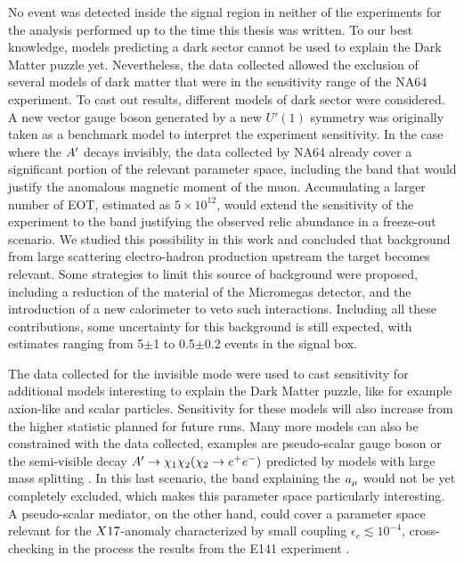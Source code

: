 No event was detected inside the signal region in neither of the experiments for the analysis performed up to the time this thesis was written. To our best knowledge, models predicting a dark sector cannot be used to explain the Dark Matter puzzle yet. Nevertheless, the data collected allowed the exclusion of several models of dark matter that were in the sensitivity range of the NA64 experiment. To cast out results, different models of dark sector were considered. A new vector gauge boson generated by a new $U'(1)$ symmetry was originally taken as a benchmark model to interpret the experiment sensitivity. In the case where the $A'$ decays invisibly, the data collected by NA64 already cover a significant portion of the relevant parameter space, including the band that would justify the anomalous magnetic moment of the muon. Accumulating a larger number of EOT, estimated as $5 \times 10^{12}$, would extend the sensitivity of the experiment to the band justifying the observed relic abundance in a freeze-out scenario. We studied this possibility in this work and concluded that background from large scattering electro-hadron production upstream the target becomes relevant. Some strategies to limit this source of background were proposed, including a reduction of the material of the Micromegas detector, and the introduction of a new calorimeter to veto such interactions. Including all these contributions, some uncertainty for this background is still expected, with estimates ranging from 5$\pm$1 to 0.5$\pm$0.2 events in the signal box.

The data collected for the invisible mode were used to cast sensitivity for additional models interesting to explain the Dark Matter puzzle, like for example axion-like and scalar particles. Sensitivity for these models will also increase from the higher statistic planned for future runs. Many more models can also be constrained with the data collected, examples are pseudo-scalar gauge boson or the semi-visible decay $A' \to \chi_1 \chi_2 (\chi_2 \to e^+e^-)$ predicted by models with large mass splitting \cite{Mohlabeng_2019}. In this last scenario, the band explaining the $a_{\mu}$ would not be yet completely excluded, which makes this parameter space particularly interesting. A pseudo-scalar mediator, on the other hand, could cover a parameter space relevant for the $X17$-anomaly characterized by small coupling $\epsilon_e \lesssim 10^{-4}$, cross-checking in the process the results from the E141 experiment \cite{blum}.


